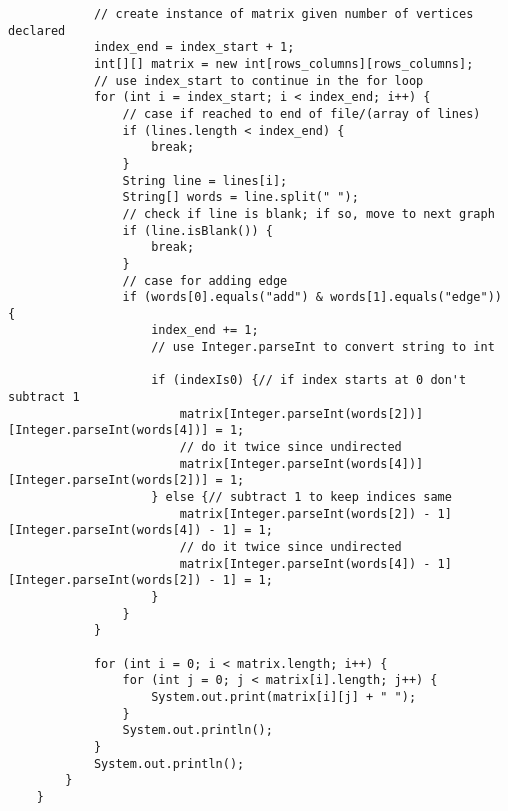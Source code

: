 \documentclass{article}
\begin{document}
\begin{lstlisting}
            // create instance of matrix given number of vertices declared
            index_end = index_start + 1;
            int[][] matrix = new int[rows_columns][rows_columns];
            // use index_start to continue in the for loop
            for (int i = index_start; i < index_end; i++) {
                // case if reached to end of file/(array of lines)
                if (lines.length < index_end) {
                    break;
                }
                String line = lines[i];
                String[] words = line.split(" ");
                // check if line is blank; if so, move to next graph
                if (line.isBlank()) {
                    break;
                }
                // case for adding edge
                if (words[0].equals("add") & words[1].equals("edge")) {
                    index_end += 1;
                    // use Integer.parseInt to convert string to int

                    if (indexIs0) {// if index starts at 0 don't subtract 1
                        matrix[Integer.parseInt(words[2])][Integer.parseInt(words[4])] = 1;
                        // do it twice since undirected
                        matrix[Integer.parseInt(words[4])][Integer.parseInt(words[2])] = 1;
                    } else {// subtract 1 to keep indices same
                        matrix[Integer.parseInt(words[2]) - 1][Integer.parseInt(words[4]) - 1] = 1;
                        // do it twice since undirected
                        matrix[Integer.parseInt(words[4]) - 1][Integer.parseInt(words[2]) - 1] = 1;
                    }
                }
            }

            for (int i = 0; i < matrix.length; i++) {
                for (int j = 0; j < matrix[i].length; j++) {
                    System.out.print(matrix[i][j] + " ");
                }
                System.out.println();
            }
            System.out.println();
        }
    }


\end{lstlisting}
\end{document}

